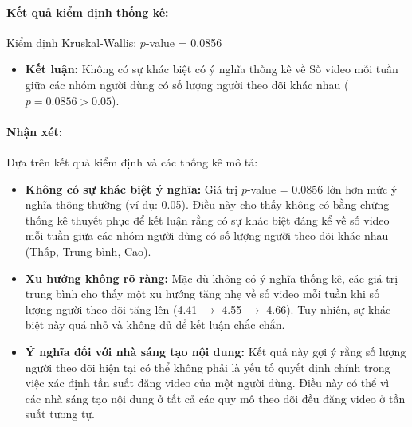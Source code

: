 \paragraph{Kết quả kiểm định thống kê:}
Kiểm định Kruskal-Wallis: $p$-value = 0.0856
\begin{itemize}
    \item \textbf{Kết luận:} Không có sự khác biệt có ý nghĩa thống kê về Số video mỗi tuần giữa các nhóm người dùng có số lượng người theo dõi khác nhau ($p = 0.0856 > 0.05$).
\end{itemize}

\paragraph{Nhận xét:} Dựa trên kết quả kiểm định và các thống kê mô tả:
\begin{itemize}
    \item \textbf{Không có sự khác biệt ý nghĩa:} Giá trị $p$-value = 0.0856 lớn hơn mức ý nghĩa thông thường (ví dụ: 0.05). Điều này cho thấy không có bằng chứng thống kê thuyết phục để kết luận rằng có sự khác biệt đáng kể về số video mỗi tuần giữa các nhóm người dùng có số lượng người theo dõi khác nhau (Thấp, Trung bình, Cao).
    
    \item \textbf{Xu hướng không rõ ràng:} Mặc dù không có ý nghĩa thống kê, các giá trị trung bình cho thấy một xu hướng tăng nhẹ về số video mỗi tuần khi số lượng người theo dõi tăng lên (4.41 $\rightarrow$ 4.55 $\rightarrow$ 4.66). Tuy nhiên, sự khác biệt này quá nhỏ và không đủ để kết luận chắc chắn.
    
    \item \textbf{Ý nghĩa đối với nhà sáng tạo nội dung:} Kết quả này gợi ý rằng số lượng người theo dõi hiện tại có thể không phải là yếu tố quyết định chính trong việc xác định tần suất đăng video của một người dùng. Điều này có thể vì các nhà sáng tạo nội dung ở tất cả các quy mô theo dõi đều đăng video ở tần suất tương tự.
\end{itemize}

